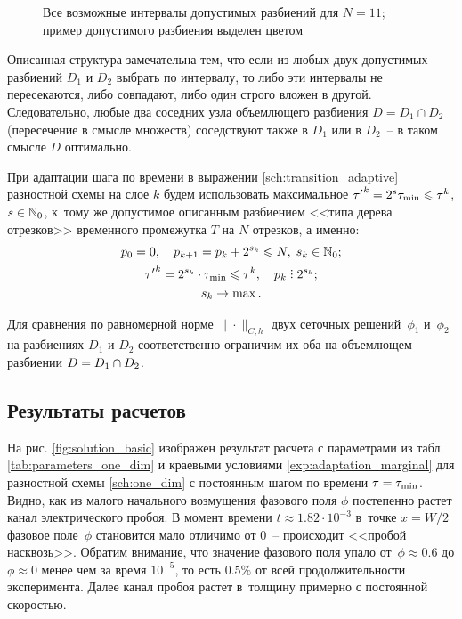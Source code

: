 \begin{figure}[!t]
    \centering
    
    \caption{\centering Все возможные интервалы допустимых разбиений для $N = 11$; \\ пример допустимого разбиения выделен цветом}
    \label{fig:segment_tree}
\end{figure}

Описанная структура замечательна тем, что если из любых двух допустимых разбиений $D_1$ и $D_2$ выбрать по интервалу, то либо эти интервалы не пересекаются, либо совпадают, либо один строго вложен в другой. Следовательно, любые два соседних узла объемлющего разбиения $D = D_1 \cap D_2$ (пересечение в смысле множеств) соседствуют также в $D_1$ или в $D_2$~-- в таком смысле $D$ оптимально.

При адаптации шага по времени в выражении \eqref{sch:transition_adaptive} разностной схемы на слое $k$ будем использовать максимальное ${\tau'}^k = 2^s {\tau_\text{min}} \leqslant \tau^k$, $s \in {\mathbb{N}}_0$, к~тому же допустимое описанным разбиением <<типа дерева отрезков>> временного промежутка $T$ на $N$ отрезков, а именно:
\begin{gather*}
    p_0 = 0, \quad p_{k + 1} = p_k + 2^{s_k} \leqslant N, \; s_k \in \Natural_0; \\
    {\tau'}^k = 2^{s_k} \cdot \taumin \leqslant \tau^k, \quad p_k \divby 2^{s_k}; \\
    s_k \to \max.
\end{gather*}

Для сравнения по равномерной норме $\| \cdot \|_{C, h}$ двух сеточных решений~$\phi_1$ и~$\phi_2$ на разбиениях $D_1$ и $D_2$ соответственно ограничим их оба на объемлющем разбиении $D \hm = D_1 \cap D_2$.


\subsection{Результаты расчетов}

На рис. \ref{fig:solution_basic} изображен результат расчета с параметрами из табл. \ref{tab:parameters_one_dim} и краевыми условиями \eqref{exp:adaptation_marginal} для разностной схемы \eqref{sch:one_dim} с постоянным шагом по времени $\tau = {\tau_\text{min}}$. Видно, как из малого начального возмущения фазового поля $\phi$ постепенно растет канал электрического пробоя. В момент времени $t \approx 1.82 \cdot 10^{-3}$ в~точке $x = W / 2$ фазовое поле~$\phi$  становится мало отличимо от $0$~-- происходит <<пробой насквозь>>. Обратим внимание, что значение фазового поля упало от~$\phi \approx 0.6$ до $\phi \approx 0$ менее чем за время $10^{-5}$, то есть $0.5 \%$ от всей продолжительности эксперимента. Далее канал пробоя растет в~толщину примерно с постоянной скоростью.

